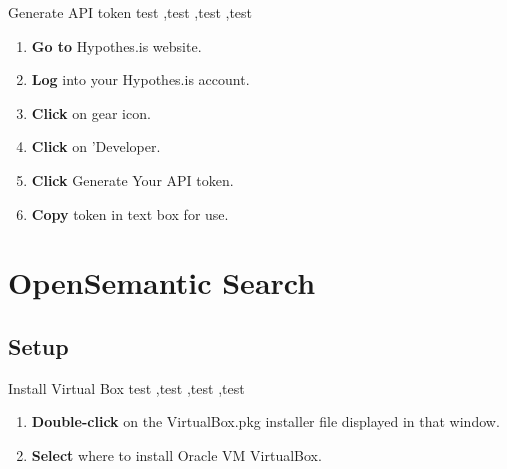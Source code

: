 \documentclass[10pt,a4paper]{article}
\begin{document}
\begin{textbox}{Generate API token}
test  \sep test \sep test \sep test

\bigskip

\begin{enumerate}
\item \textbf{Go to} Hypothes.is website. 
\item \textbf{Log} into your Hypothes.is account.
\item \textbf{Click} on gear icon.
\item \textbf{Click} on 'Developer.
\item \textbf{Click} Generate Your API token.
\item \textbf{Copy} token in text box for use.

\end{enumerate}

\end{textbox}


\section{OpenSemantic Search}
\subsection{Setup}


\begin{textbox}{Install Virtual Box}
test  \sep test \sep test \sep test

\bigskip


\begin{enumerate}
\item \textbf {Double-click} on the VirtualBox.pkg installer file displayed in that window.
\item \textbf {Select} where to install Oracle VM VirtualBox.

\end{enumerate}


\end{textbox}
\end{document}

